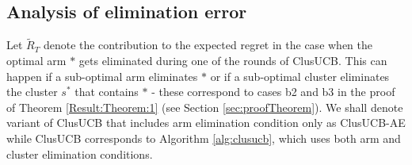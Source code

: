 % 
%
%
%
%
%

\subsection*{Analysis of elimination error}
Let $\tilde R_T$ denote the contribution  to the expected regret in the case when the optimal arm $*$ gets eliminated during one of the rounds of ClusUCB. This can happen if a sub-optimal arm eliminates $*$ or if a sub-optimal cluster eliminates the cluster $s^*$ that contains $*$ - these correspond to cases b2 and b3 in the proof of Theorem \ref{Result:Theorem:1} (see Section \ref{sec:proofTheorem}). 
We shall denote variant of ClusUCB that includes arm elimination condition only as ClusUCB-AE while ClusUCB corresponds to Algorithm \ref{alg:clusucb}, which uses both arm and cluster elimination conditions.

